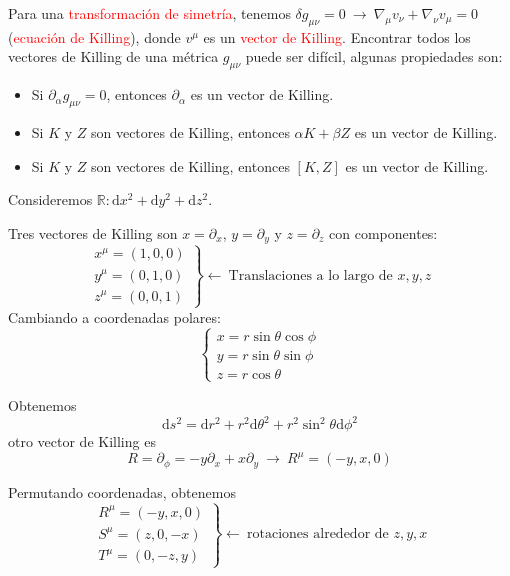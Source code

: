 \documentclass[../main]{subfiles}
\begin{document}
Para una \textcolor{red}{transformación de simetría}, tenemos $\delta g_{\mu\nu}=0 \ \rightarrow \ \nabla_{\mu} v_{\nu}+\nabla_{\nu} v_{\mu}=0$ (\textcolor{red}{ecuación de Killing}), donde $v^{\mu}$ es un \textcolor{red}{vector de Killing}. Encontrar todos los vectores de Killing de una métrica $g_{\mu\nu}$ puede ser difícil, algunas propiedades son:
\begin{itemize}
    \item Si $\partial_{\alpha} g_{\mu\nu}=0$, entonces $\partial_{\alpha}$ es un vector de Killing.
    \item Si $K$ y $Z$ son vectores de Killing, entonces $\alpha K+\beta Z$ es un vector de Killing.
    \item Si $K$ y $Z$ son vectores de Killing, entonces $[K, Z]$ es un vector de Killing.
\end{itemize}  

\ejemplo{} Consideremos $\mathbb{R}: \mathrm{d}x^2+\mathrm{d}y^2+\mathrm{d}z^2$.

Tres vectores de Killing son $x=\partial_x$, $y=\partial_y$ y $z=\partial_z$ con componentes:
\begin{equation}
    \left.
    \begin{array}{c}
        x^{\mu}=(1, 0, 0)\\
        y^{\mu}=(0, 1, 0)\\
        z^{\mu}=(0, 0, 1)
    \end{array}
    \right\}
    \leftarrow \ \text{Translaciones a lo largo de } x, y, z
\end{equation}
Cambiando a coordenadas polares:
\begin{equation}
    \left\{
    \begin{array}{c}
        x= r\sin \theta \cos \phi \\
        y= r\sin \theta \sin \phi \\
        z= r\cos \theta
    \end{array}
    \right.
\end{equation}

Obtenemos 
\begin{equation}
    \mathrm{d}s^2=\mathrm{d}r^2+r^2\mathrm{d}\theta^2+r^2\sin^2 \theta \mathrm{d}\phi^2
\end{equation}
otro vector de Killing es 
\begin{equation}
    R=\partial_{\phi}=-y\partial_x+x\partial_y \ \rightarrow \ R^{\mu}=(-y, x, 0)
\end{equation}

Permutando coordenadas, obtenemos 
\begin{equation}
    \left.
    \begin{array}{c}
        R^{\mu}=(-y, x, 0)\\
        S^{\mu}=(z, 0, -x)\\
        T^{\mu}=(0, -z, y)
    \end{array}
    \right\}
    \leftarrow \ \text{rotaciones alrededor de } z, y, x
\end{equation}
\end{document}
